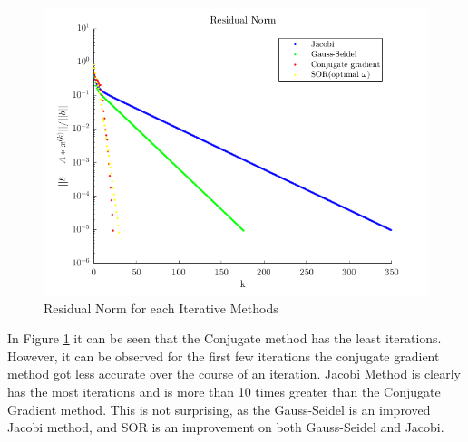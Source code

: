 \documentclass[12pt,a4paper]{article}
\begin{document}
\begin{figure}[H]
	\includegraphics[width=\linewidth]{images/ResidualNormGraph.png}
	\caption{Residual Norm for each Iterative Methods}
	\label{fig:res}
\end{figure}
In Figure \ref{fig:res} it can be seen that the Conjugate method has the least iterations. However, it can be observed for the first few iterations the conjugate gradient method got less accurate over the course of an iteration. Jacobi Method is clearly has the most iterations and is more than 10 times greater than the Conjugate Gradient method. This is not surprising, as the Gauss-Seidel is an improved Jacobi method, and SOR is an improvement on both Gauss-Seidel and Jacobi.
\end{document}
